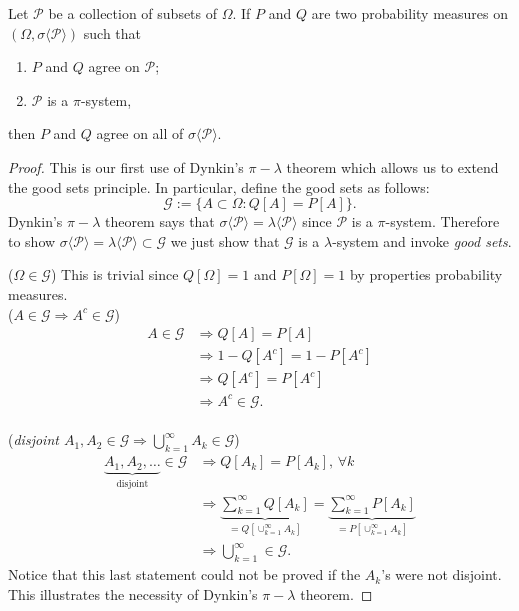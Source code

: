 \begin{theorem}
\label{ui}
Let $\mathcal P$ be a collection of subsets of $\Omega$.
If $P$ and $Q$ are two probability measures on $(\Omega, \sigma\langle \mathcal P\rangle)$ such that
\begin{enumerate}
\item $P$ and $Q$ agree on $\mathcal P$;
\item $\mathcal P$ is a $\pi$-system,
\end{enumerate}
then $P$ and $Q$ agree on all of $ \sigma\langle \mathcal P\rangle$.
\end{theorem}
\begin{proof}
This is our first use of Dynkin's $\pi-\lambda$ theorem which allows us to extend the good sets principle. In particular, define the good sets as follows:
\begin{equation}
\mathcal G:=\{A\subset \Omega\colon Q[A] = P[A] \}.
\end{equation}
Dynkin's $\pi-\lambda$ theorem says that $\sigma\langle \mathcal P\rangle = \lambda\langle \mathcal P\rangle$ since $\mathcal P$ is a $\pi$-system. Therefore to show $\sigma\langle \mathcal P\rangle = \lambda\langle \mathcal P\rangle\subset \mathcal G$ we just show that $\mathcal G$ is a $\lambda$-system and invoke {\it good sets}.

\textbullet({\sl $\Omega \in \mathcal G$}) This is trivial since $Q[\Omega]=1$ and $P[\Omega]=1$  by properties probability measures.
\\
\textbullet({\sl $A\in \mathcal  G\Longrightarrow A^c\in \mathcal G$})
\begin{align*}
A\in \mathcal G
&\Longrightarrow Q[A] = P[A]  \\
&\Longrightarrow 1-Q[A^c] = 1-P[A^c] \\
&\Longrightarrow Q[A^c] = P[A^c] \\
&\Longrightarrow A^c\in \mathcal G.
\end{align*}
\\
\textbullet({\sl disjoint $A_1, A_2\in \mathcal  G\Longrightarrow \bigcup_{k=1}^\infty A_k\in \mathcal G$})
\begin{align*}
\underbrace{A_1,A_2,\ldots}_{\text{disjoint}}\in \mathcal G
&\Longrightarrow  Q[A_k] = P[A_k],\,\forall k  \\
&\Longrightarrow \underbrace{\sum_{k=1}^\infty Q[A_k]}_{=Q[\cup_{k=1}^\infty A_k]} = \underbrace{\sum_{k=1}^\infty P[A_k]}_{=P[\cup_{k=1}^\infty A_k]}  \\
&\Longrightarrow \bigcup_{k=1}^\infty \in \mathcal G.
\end{align*}
Notice that this last statement could not be proved if the $A_k$'s were not disjoint. This illustrates the necessity of Dynkin's $\pi-\lambda$ theorem.

\end{proof}





